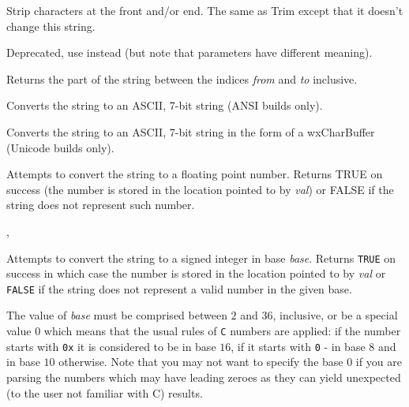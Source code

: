 Strip characters at the front and/or end. The same as Trim except that it
doesn't change this string.

\label{wxstringsubstring}


Deprecated, use  instead (but note that parameters
have different meaning).

Returns the part of the string between the indices {\it from} and {\it to}
inclusive.

\label{wxstringtoascii}


Converts the string to an ASCII, 7-bit string (ANSI builds only).


Converts the string to an ASCII, 7-bit string in the form of
a wxCharBuffer (Unicode builds only).

\label{wxstringtodouble}


Attempts to convert the string to a floating point number. Returns TRUE on
success (the number is stored in the location pointed to by {\it val}) or FALSE
if the string does not represent such number.


,\\

\label{wxstringtolong}


Attempts to convert the string to a signed integer in base {\it base}. Returns
{\tt TRUE} on success in which case the number is stored in the location
pointed to by {\it val} or {\tt FALSE} if the string does not represent a
valid number in the given base.

The value of {\it base} must be comprised between $2$ and $36$, inclusive, or
be a special value $0$ which means that the usual rules of {\tt C} numbers are
applied: if the number starts with {\tt 0x} it is considered to be in base
$16$, if it starts with {\tt 0} - in base $8$ and in base $10$ otherwise. Note
that you may not want to specify the base $0$ if you are parsing the numbers
which may have leading zeroes as they can yield unexpected (to the user not
familiar with C) results.

